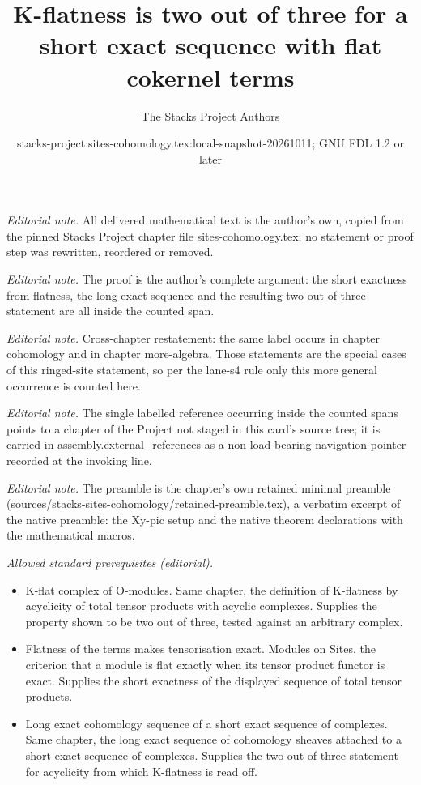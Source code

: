 \documentclass[10pt,a4paper]{amsart}
\title{K-flatness is two out of three for a short exact sequence with flat cokernel terms}
\author{The Stacks Project Authors}
\date{stacks-project:sites-cohomology.tex:local-snapshot-20261011; GNU FDL 1.2 or later}
\theoremstyle{plain}
\theoremstyle{definition}
\theoremstyle{remark}
\numberwithin{equation}{subsection}
\begin{document}
\maketitle
\noindent\textit{Editorial note.} All delivered mathematical text is the author's own, copied from the pinned Stacks Project chapter file sites-cohomology.tex; no statement or proof step was rewritten, reordered or removed.\par\medskip
\noindent\textit{Editorial note.} The proof is the author's complete argument: the short exactness from flatness, the long exact sequence and the resulting two out of three statement are all inside the counted span.\par\medskip
\noindent\textit{Editorial note.} Cross-chapter restatement: the same label occurs in chapter cohomology and in chapter more-algebra. Those statements are the special cases of this ringed-site statement, so per the lane-s4 rule only this more general occurrence is counted here.\par\medskip
\noindent\textit{Editorial note.} The single labelled reference occurring inside the counted spans points to a chapter of the Project not staged in this card's source tree; it is carried in assembly.external\_references as a non-load-bearing navigation pointer recorded at the invoking line.\par\medskip
\noindent\textit{Editorial note.} The preamble is the chapter's own retained minimal preamble (sources/stacks-sites-cohomology/retained-preamble.tex), a verbatim excerpt of the native preamble: the Xy-pic setup and the native theorem declarations with the mathematical macros.\par\medskip
\noindent\textit{Allowed standard prerequisites (editorial).}\begin{itemize}
\item K-flat complex of O-modules. Same chapter, the definition of K-flatness by acyclicity of total tensor products with acyclic complexes. Supplies the property shown to be two out of three, tested against an arbitrary complex.
\item Flatness of the terms makes tensorisation exact. Modules on Sites, the criterion that a module is flat exactly when its tensor product functor is exact. Supplies the short exactness of the displayed sequence of total tensor products.
\item Long exact cohomology sequence of a short exact sequence of complexes. Same chapter, the long exact sequence of cohomology sheaves attached to a short exact sequence of complexes. Supplies the two out of three statement for acyclicity from which K-flatness is read off.
\end{itemize}\medskip
\end{document}
